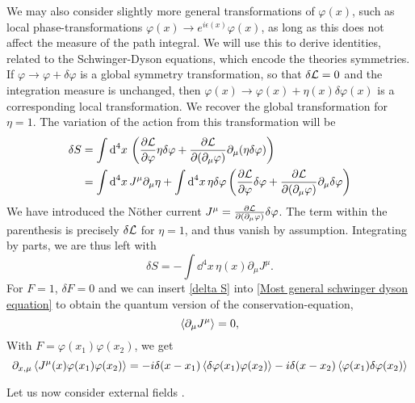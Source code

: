 We may also consider slightly more general transformations of $\varphi(x)$, such as local phase-transformations $\varphi(x) \rightarrow e^{i\epsilon(x)}\varphi(x)$, as long as this does not affect the measure of the path integral.
We will use this to derive identities, related to the Schwinger-Dyson equations, which encode the theories symmetries.
If $\varphi \rightarrow \varphi + \delta \varphi$ is a global symmetry transformation, so that $\delta \mathcal{L} = 0$ and the integration measure is unchanged, then $\varphi(x) \rightarrow \varphi(x) + \eta(x) \delta \varphi(x)$ is a corresponding local transformation.
We recover the global transformation for $\eta = 1$.
The variation of the action from this transformation will be
%
\begin{align}
    \delta S 
    &= 
    \int \text{d}^4 x \,
    \left(
        \pdv{\mathcal{L}}{\varphi} \eta \delta \varphi
        + \pdv{\mathcal{L}}{(\partial_\mu\varphi) } \partial_\mu (\eta \delta \varphi)
    \right)\\
    & =
    \int \text{d}^4 x \, J^\mu \partial_\mu \eta
    + \int \text{d}^4 x \, \eta \delta \varphi
    \left( 
        \pdv{\mathcal{L}}{\varphi} \delta \varphi 
        + \pdv{\mathcal{L}}{(\partial_\mu \varphi)} \partial_\mu \delta \varphi  
    \right)
\end{align}
%
We have introduced the Nöther current $J^\mu = \pdv{\mathcal{L}}{(\partial_\mu \varphi)} \delta \varphi$.
The term within the parenthesis is precisely $\delta \mathcal{L}$ for $\eta = 1$, and thus vanish by assumption.
Integrating by parts, we are thus left with
%
\begin{equation}
    \label{delta S}
    \delta S = - \int \dd^4 x \, \eta(x) \partial_\mu J^\mu.
\end{equation}
%
For $F = 1$, $\delta F = 0$ and we can insert \autoref{delta S} into \autoref{Most general schwinger dyson equation} to obtain the quantum version of the conservation-equation,
%
\begin{equation}
    \Braket{\partial_\mu J^\mu} = 0,
\end{equation}
%
With $F = \varphi(x_1) \varphi(x_2)$, we get
%
\begin{equation}
    \partial_{x, \mu} \braket{J^\mu (x)\varphi(x_1) \varphi(x_2)}
    = -i \delta(x - x_1) \braket{\delta \varphi(x_1) \varphi(x_2)}
    - i \delta(x - x_2) \braket{\varphi(x_1) \delta \varphi(x_2)}
\end{equation}
%

Let us now consider external fields
\autocite{schwartzQuantumFieldTheory2013,peskinIntroductionQuantumField1995}.




